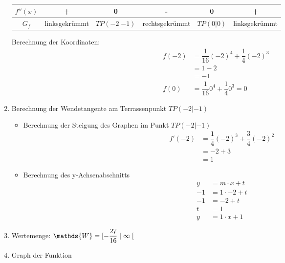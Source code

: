 \begin{bsp}{}{}
\begin{enumerate}
\begin{center}
\begin{tabular}{||c|c|c|c|c|c||}
    $f''(x)$ & + & 0 & - & 0 & +\\ 
    \hline
    \hline
    $G_f$ & linksgekrümmt & $TP(-2|-1)$ & rechtsgekrümmt  & $TP(0|0) $& linksgekrümmt\\
    \hline
\end{tabular}
\end{center}
Berechnung der Koordinaten:
           \begin{equation*}
        \begin{split}
         f(-2)&= \dfrac{1}{16} (-2)^4 +\dfrac{1}{4} (-2)^3\\
         &= 1-2 \\
         &= -1\\
         f(0) &= \dfrac{1}{16} 0^4 +\dfrac{1}{4} 0^3 = 0
        \end{split}
\end{equation*}
\item Berechnung der Wendetangente am Terrassenpunkt $TP(-2|-1)$
\begin{itemize}
    \item Berechnung der Steigung des Graphen im Punkt $TP(-2|-1)$ 
    \begin{equation*}
        \begin{split}
         f'(-2)&= \dfrac{1}{4} (-2)^3 +\dfrac{3}{4} (-2)^2\\
         &= -2+3\\
         &= 1
        \end{split}
\end{equation*}
\item Berechnung des y-Achsenabschnitts
\begin{equation*}
        \begin{split}
        y &= m \cdot x +t \\
         -1 &= 1\cdot -2 +t \\
        -1 &= -2 +t \\
        t &= 1\\
         y&= 1\cdot x +1
        \end{split}
\end{equation*}
\end{itemize}
\item Wertemenge: $\mathds{W}= [-\dfrac{27}{16} \hspace{0.1cm}|\hspace{0.1cm} \infty \hspace{0.1cm}[ $
\item Graph der Funktion
\begin{center}

\end{center}
\end{enumerate}
\end{bsp}
